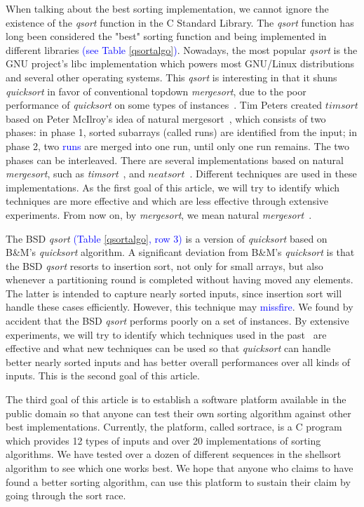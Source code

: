 \documentclass[AMA,STIX1COL]{WileyNJD-v2}
\newcommand{\qusort}{\emph{quicksort }}
\newcommand{\qsort}{\emph{qsort }}
\newcommand{\tsortn}{\emph{timsort}}
\newcommand{\msortn}{\emph{mergesort}}
\begin{document}
When talking about the best sorting implementation, we cannot ignore the existence of the \qsort function in the C Standard Library.
The \qsort function has long been considered the "best" sorting function and being implemented in different libraries \textcolor{blue}{(see Table \ref{qsortalgo})}. 
Nowadays, the most popular \qsort is the GNU project’s libc implementation which powers most GNU/Linux distributions and several other operating systems. 
This \qsort is interesting in that it shuns \qusort in favor of conventional topdown \msortn, due to the poor performance of \qusort on some types of instances~\cite{gnumergesort}.  
Tim Peters created $timsort$ based on Peter McIlroy’s idea of natural mergesort~\cite{mcilroy1993optimistic}, which consists of two phases: in phase 1, sorted subarrays (called runs) are identified from the input; in phase 2, two \textcolor{blue}{runs} are merged into one run, until only one run remains. 
The two phases can be interleaved. 
There are several implementations based on natural \msortn, such as \tsortn~\cite{timsort}, and $neatsort$~\cite{la2014neatsort}. 
Different techniques are used in these implementations. 
As the first goal of this article, we will try to identify which techniques are more effective and which are less effective through extensive experiments. 
From now on, by \msortn, we mean natural \msortn~\cite{mcilroy1993optimistic}.

The BSD \qsort \textcolor{blue}{(Table \ref{qsortalgo}, row 3)} is a version of \qusort based on B\&M’s \qusort algorithm. 
A significant deviation from B\&M’s \qusort is that the BSD \qsort resorts to insertion sort, not only for small arrays, but also whenever a partitioning round is completed without having moved any elements. 
The latter is intended to capture nearly sorted inputs, since insertion sort will handle these cases efficiently. 
However, this technique may \textcolor{blue}{missfire}. We found by accident that the BSD \qsort performs poorly on a set of instances. 
By extensive experiments, we will try to identify which techniques used in the past~\cite{sedgewick1978implementing} are effective and what new techniques can be used so that \qusort can handle better nearly sorted inputs and has better overall performances over all kinds of inputs. 
This is the second goal of this article.

The third goal of this article is to establish a software platform available in the public domain so that anyone can test their own sorting algorithm against other best implementations. 
Currently, the platform, called sortrace, is a C program which provides 12 types of inputs and over 20 implementations of sorting algorithms. 
We have tested over a dozen of different sequences in the shellsort algorithm to see which one works best. 
We hope that anyone who claims to have found a better sorting algorithm, can use this platform to sustain their claim by going through the sort race.  
\end{document}
